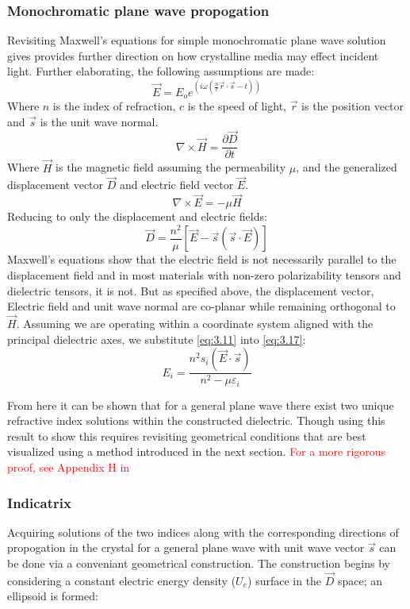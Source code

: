 \subsubsection{Monochromatic plane wave propogation}
Revisiting Maxwell's equations for simple monochromatic plane wave solution gives provides further direction on how crystalline media may effect incident light. Further elaborating, the following assumptions are made:
\begin{equation}
\vec{E} = E_o e^{(i \omega (\frac{n}{c} \vec{r}\cdot \vec{s}-t))}
\end{equation}
Where $n$ is the index of refraction, $c$ is the speed of light, $\vec{r}$ is the position vector and $\vec{s}$ is the unit wave normal.
\begin{equation}
\nabla \times \vec{H}= \frac{\partial \vec{D}}{\partial t}
\end{equation}
Where $\vec{H}$ is the magnetic field assuming the permeability $\mu$, and the generalized displacement vector $\vec{D}$ and electric field vector $\vec{E}$.
\begin{equation}
\nabla \times \vec{E} = -\mu \vec{H}
\end{equation}
Reducing to only the displacement and electric fields:
\begin{equation}\label{eq:3.17}
\vec{D} = \frac{n^2}{\mu}[\vec{E}-\vec{s}(\vec{s}\cdot \vec{E})]
\end{equation}
Maxwell's equations show that the electric field is not necessarily parallel to the displacement field and in most materials with non-zero polarizability tensors and dielectric tensors, it is not. But as specified above, the displacement vector, Electric field and unit wave normal are co-planar while remaining orthogonal to $\vec{H}$. Assuming we are operating within a coordinate system aligned with the principal dielectric axes, we substitute \ref{eq:3.11} into \ref{eq:3.17}:
\begin{equation}\label{eq:3.18}
E_i = \frac{n^2 s_i (\vec{E}\cdot\vec{s})}{n^2 - \mu \varepsilon_i}
\end{equation}

From here it can be shown that for a general plane wave there exist two unique refractive index solutions within the constructed dielectric. Though using this result to show this requires revisiting geometrical conditions that are best visualized using a method introduced in the next section. \textcolor{red}{For a more rigorous proof, see Appendix H in} \cite{nye}

\subsubsection{Indicatrix}\label{sec:indicatrix}
Acquiring solutions of the two indices along with the corresponding directions of propogation in the crystal for a general plane wave with unit wave vector $\vec{s}$ can be done via a conveniant geometrical construction. The construction begins by considering a constant electric energy density ($U_e$) surface in the $\vec{D}$ space; an ellipsoid is formed:

